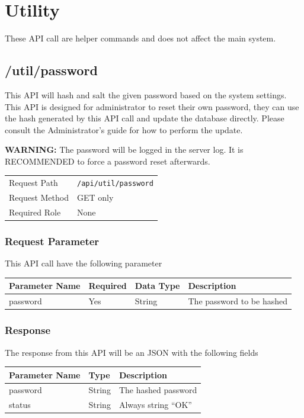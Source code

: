 \documentclass[12pt]{report}
\begin{document}
    \chapter{Utility}\label{ch:utility}
    These API call are helper commands and does not affect the main system.

    \section{/util/password}\label{api:util/password}
    This API will hash and salt the given password based on the system settings.
    This API is designed for administrator to reset their own password, they can use the hash generated by this API
    call and update the database directly.
    Please consult the Administrator's guide for how to perform the update.
    
    \begin{infobox}
        \textbf{WARNING:} The password will be logged in the server log.
        It is RECOMMENDED to force a password reset afterwards.
    \end{infobox}

    \begin{longtable}{p{5cm}p{10cm}}
        Request Path   & \texttt{/api/util/password} \\
        Request Method & GET only \\
        Required Role  & None
    \end{longtable}
    \subsection{Request Parameter}
    This API call have the following parameter

    \begin{longtable}{|l|l|l||p{7cm}|}
        \hline
        Parameter Name & Required & Data Type & Description \\\hline\endhead
        password & Yes & String & The password to be hashed \\\hline
    \end{longtable}

    \subsection{Response}
    The response from this API will be an JSON with the following fields
    \begin{longtable}{|p{}|p{}||p{}|}\hline
        Parameter Name & Type & Description \\\hline\endhead
        password & String & The hashed password \\\hline
        status & String & Always string ``OK'' \\\hline
    \end{longtable}
\end{document}
